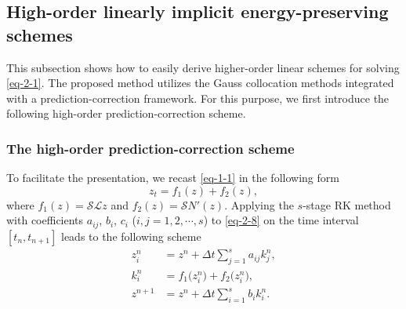 \documentclass[onefignum,onetabnum]{siamart}
\begin{document}
\subsection{High-order linearly implicit energy-preserving schemes}
This subsection shows how to easily derive higher-order linear schemes for solving \eqref{eq-2-1}. The proposed method utilizes the Gauss collocation methods integrated with a prediction-correction framework. For this purpose, we first introduce the following high-order prediction-correction scheme.
\subsubsection{The high-order prediction-correction scheme}
To facilitate the presentation, we recast \eqref{eq-1-1} in the following form
\begin{equation}\label{eq-2-8}
	z_t=f_1(z)+f_2(z),
\end{equation}
where $f_1(z)=\mathcal{S}\mathcal{L}z$ and $f_2(z)=\mathcal{S}N'(z)$. Applying the $s$-stage RK method \cite{hairer-06-GNI-ODE} with coefficients $a_{ij}$, $b_i$, $c_i$ ($i,j=1,2,\cdots,s$) to \eqref{eq-2-8} on the time interval $[t_n,t_{n+1}]$ leads to the following scheme
\begin{equation}\label{eq-2-9}
	\begin{aligned}
		z_i^n&=z^n+\Delta t\sum_{j=1}^sa_{ij}k_j^n,\\
		k_i^n&=f_1\big(z_i^n\big)+f_2\big(z_i^n\big),\\
		z^{n+1}&=z^n+\Delta t\sum_{i=1}^sb_ik_i^n.
	\end{aligned}
\end{equation}
\end{document}
